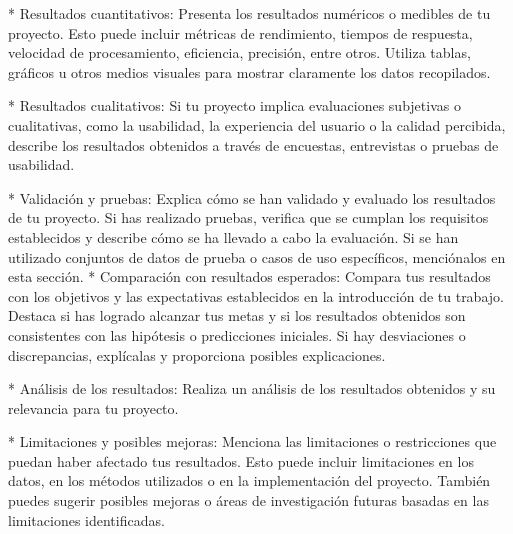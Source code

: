 * Resultados cuantitativos: Presenta los resultados numéricos o medibles de tu proyecto. Esto puede incluir métricas de
rendimiento, tiempos de respuesta, velocidad de procesamiento, eficiencia, precisión, entre otros. Utiliza tablas,
gráficos u otros medios visuales para mostrar claramente los datos recopilados.

* Resultados cualitativos: Si tu proyecto implica evaluaciones subjetivas o cualitativas, como la usabilidad, la
experiencia del usuario o la calidad percibida, describe los resultados obtenidos a través de encuestas, entrevistas o
pruebas de usabilidad.

* Validación y pruebas: Explica cómo se han validado y evaluado los resultados de tu proyecto. Si has realizado pruebas,
verifica que se cumplan los requisitos establecidos y describe cómo se ha llevado a cabo la evaluación. Si se han
utilizado conjuntos de datos de prueba o casos de uso específicos, menciónalos en esta sección.
* Comparación con resultados esperados: Compara tus resultados con los objetivos y las expectativas establecidos en la
introducción de tu trabajo. Destaca si has logrado alcanzar tus metas y si los resultados obtenidos son consistentes
con las hipótesis o predicciones iniciales. Si hay desviaciones o discrepancias, explícalas y proporciona posibles
explicaciones.

* Análisis de los resultados: Realiza un análisis de los resultados obtenidos y su relevancia para tu proyecto.

* Limitaciones y posibles mejoras: Menciona las limitaciones o restricciones que puedan haber afectado tus resultados.
Esto puede incluir limitaciones en los datos, en los métodos utilizados o en la implementación del proyecto. También
puedes sugerir posibles mejoras o áreas de investigación futuras basadas en las limitaciones identificadas.